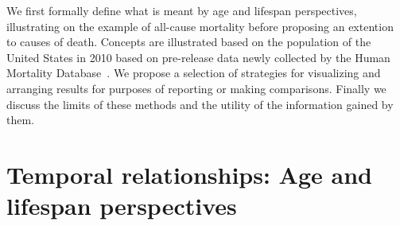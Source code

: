 \documentclass{article}
\begin{document}
We first formally define what is meant by age and lifespan
perspectives, illustrating on the example of all-cause
mortality before proposing an extention to causes of death. Concepts are
illustrated based on the population of the United States in 2010 based on pre-release
data newly collected by the Human Mortality
Database~. We propose
a selection of strategies for visualizing and arranging results for purposes of
reporting or making comparisons. Finally we discuss the limits of these methods
and the utility of the information gained by them. 

\section*{Temporal relationships: Age and lifespan perspectives}

\end{document}
